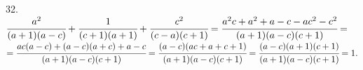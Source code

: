 32. $\cfrac{a^2}{(a+1)(a-c)}+\cfrac{1}{(c+1)(a+1)}+\cfrac{c^2}{(c-a)(c+1)}=\cfrac{a^2c+a^2+a-c-ac^2-c^2}{(a+1)(a-c)(c+1)}=$\\$=
\cfrac{ac(a-c)+(a-c)(a+c)+a-c}{(a+1)(a-c)(c+1)}=\cfrac{(a-c)(ac+a+c+1)}{(a+1)(a-c)(c+1)}=\cfrac{(a-c)(a+1)(c+1)}{(a+1)(a-c)(c+1)}=1.$\\
